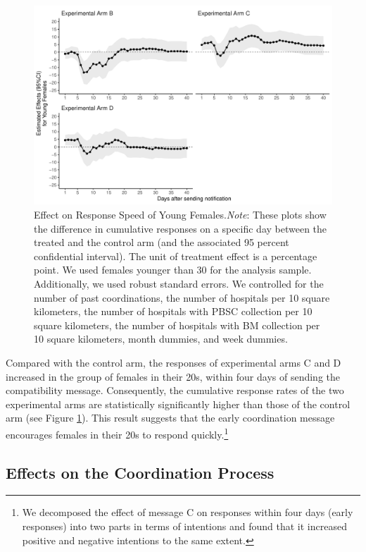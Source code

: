 \documentclass [12pt, a4paper]{article}
\begin{document}
\begin{figure}[t]
\includegraphics{JMDP RCT - Main Document_files/figure-latex/young-female-flow-1} \caption{Effect on Response Speed of Young Females.\newline \emph{Note}: These plots show the difference in cumulative responses on a specific day between the treated and the control arm (and the associated 95 percent confidential interval). The unit of treatment effect is a percentage point. We used females younger than 30 for the analysis sample. Additionally, we used robust standard errors. We controlled for the number of past coordinations, the number of hospitals per 10 square kilometers, the number of hospitals with PBSC collection per 10 square kilometers, the number of hospitals with BM collection per 10 square kilometers, month dummies, and week dummies.}\label{fig:young-female-flow}
\end{figure}

Compared with the control arm, the responses of experimental arms C and D increased in the group of females in their 20s, within four days of sending the compatibility message. Consequently, the cumulative response rates of the two experimental arms are statistically significantly higher than those of the control arm (see Figure \ref{fig:young-female-flow}). This result suggests that the early coordination message encourages females in their 20s to respond quickly.\footnote{We decomposed the effect of message C on responses within four days (early responses) into two parts in terms of intentions and found that it increased positive and negative intentions to the same extent.}

\hypertarget{process}{%
\subsection{Effects on the Coordination Process}\label{process}}
\end{document}
